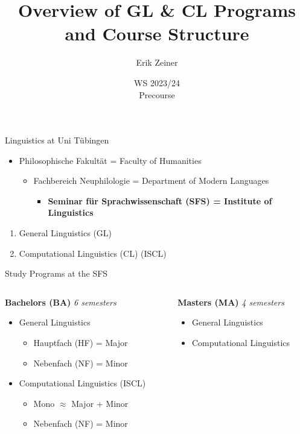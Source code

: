 \documentclass[aspectratio=169,hyperref={unicode},xcolor={dvipsnames}]{beamer}
\title{Overview of GL \& CL Programs and Course Structure}
\author{Erik Zeiner}
\institute{Fachschaft General \& Computational Linguistics\\ \textbf{University of Tübingen}}
\date{WS 2023/24 \\ Precourse}
\begin{document}
\frame{\titlepage}
\begin{frame}{Linguistics at Uni Tübingen}
\begin{itemize}
	\item Philosophische Fakultät = Faculty of Humanities
		\begin{itemize}
			\item Fachbereich Neuphilologie = Department of Modern Languages
				\begin{itemize}
					\item \textbf{Seminar für Sprachwissenschaft (SFS) = Institute of Linguistics}
				\end{itemize}
		\end{itemize}
\end{itemize}
\begin{enumerate}
	\item General Linguistics (GL)
	\item Computational Linguistics (CL) (ISCL)
\end{enumerate}
\end{frame}

\begin{frame}{Study Programs at the SFS}
\begin{columns}[T]
	\begin{column}{0.5\linewidth}
   		\textbf{Bachelors (BA)} \textit{6 semesters}
		\begin{itemize}
			\item General Linguistics 
				\begin{itemize}
					\item Hauptfach (HF) = Major 
					\item Nebenfach (NF) = Minor
			\end{itemize}
			\item Computational Linguistics (ISCL)
				\begin{itemize}
					\item Mono $\approx$ Major + Minor
					\item Nebenfach (NF) = Minor
				\end{itemize}
		\end{itemize}
	\end{column}
	\begin{column}{0.5\linewidth}
	   		\textbf{Masters (MA)} \textit{4 semesters}
		\begin{itemize}
			\item General Linguistics 
			\item Computational Linguistics 
		\end{itemize}
	\end{column}
\end{columns}
\end{frame}
\end{document}
